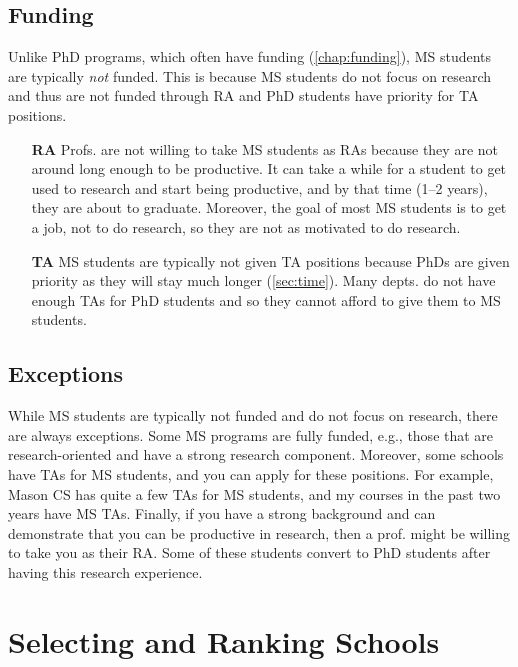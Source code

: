 \documentclass[oneside,11pt,dvipsnames]{book}
\newcommand{\sectioninfo}[1]{%
  \phantomsection
  \addcontentsline{toc}{sectioninfo}{\textcolor{black}{\emph{#1}}}%
}
\begin{document}
\subsection{Funding}\label{sec:ms-funding}
Unlike PhD programs, which often have funding (\autoref{chap:funding}), MS students are typically \emph{not} funded. This is because MS students do not focus on research and thus are not funded through RA and PhD students have priority for TA positions. 

\begin{itemize}
\item[\textbf{RA}] Profs. are not willing to take MS students as RAs because they are not around long enough to be productive. It can take a while for a student to get used to research and start being productive, and by that time (1--2 years), they are about to graduate. Moreover, the goal of most MS students is to get a job, not to do research, so they are not as motivated to do research.

\item[\textbf{TA}] MS students are typically not given TA positions because PhDs are given priority as they will stay much longer (\autoref{sec:time}). Many depts. do not have enough TAs for PhD students and so they cannot afford to give them to MS students.
\end{itemize}

\subsection{Exceptions} 
While MS students are typically not funded and do not focus on research, there are always exceptions.
Some MS programs are fully funded, e.g., those that are research-oriented and have a strong research component.
Moreover, some schools have TAs for MS students, and you can apply for these positions. For example, Mason CS has quite a few TAs for MS students, and my courses in the past two years have MS TAs.
Finally, if you have a strong background and can demonstrate that you can be productive in research, then a prof. might be willing to take you as their RA.  Some of these students convert to PhD students after having this research experience.

\section{Selecting and Ranking Schools}\label{sec:selecting-ranking-schools-ms}
\end{document}

